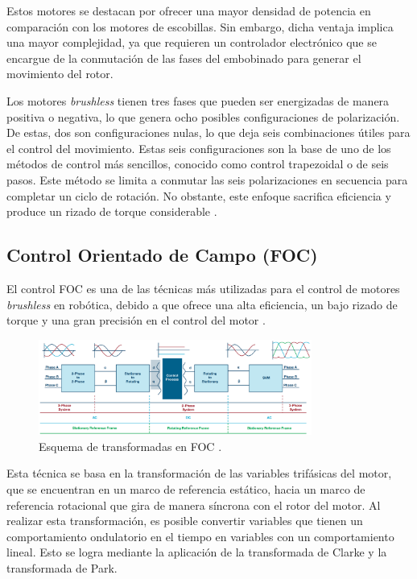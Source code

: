 \documentclass[11pt]{report}
\begin{document}
Estos motores se destacan por ofrecer una mayor densidad de potencia en comparación con los motores de escobillas. Sin embargo, dicha ventaja implica una mayor complejidad, ya que requieren un controlador electrónico que se encargue de la conmutación de las fases del embobinado para generar el movimiento del rotor.

Los motores \textit{brushless} tienen tres fases que pueden ser energizadas de manera positiva o negativa, lo que genera ocho posibles configuraciones de polarización. De estas, dos son configuraciones nulas, lo que deja seis combinaciones útiles para el control del movimiento. Estas seis configuraciones son la base de uno de los métodos de control más sencillos, conocido como control trapezoidal o de seis pasos. Este método se limita a conmutar las seis polarizaciones en secuencia para completar un ciclo de rotación. No obstante, este enfoque sacrifica eficiencia y produce un rizado de torque considerable \cite{fisher2014high_STEP} \cite{juanpere_tecnicas}.

\newpage
\subsection{Control Orientado de Campo (FOC)}
El control FOC es una de las técnicas más utilizadas para el control de motores \textit{brushless} en robótica, debido a que ofrece una alta eficiencia, un bajo rizado de torque y una gran precisión en el control del motor \cite{Garca2011ComparisonBF}\cite{juanpere_tecnicas}.

\begin{figure}[ht]
    \centering
    \includegraphics[width=0.8\textwidth]{imagenes/transformadas_foc.png}
    \caption{Esquema de transformadas en FOC \cite{frick2018bldc}.}
    \label{fig:foc_transform}
\end{figure}
\FloatBarrier

Esta técnica se basa en la transformación de las variables trifásicas del motor, que se encuentran en un marco de referencia estático, hacia un marco de referencia rotacional que gira de manera síncrona con el rotor del motor. Al realizar esta transformación, es posible convertir variables que tienen un comportamiento ondulatorio en el tiempo en variables con un comportamiento lineal. Esto se logra mediante la aplicación de la transformada de Clarke y la transformada de Park.
\end{document}

